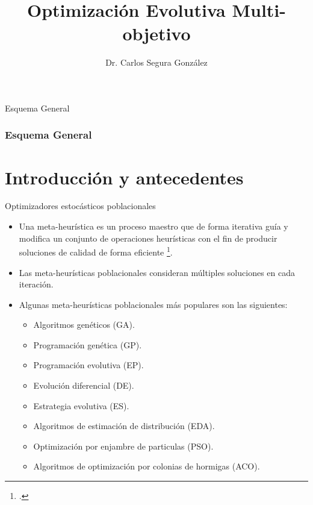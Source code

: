 \documentclass{beamer}
\title[Your Short Title]{Optimización Evolutiva Multi-objetivo}
\author{Dr. Carlos Segura González}
\institute{Centro de Investigación de Matemáticas}
\begin{document}
\begin{frame}
  \titlepage
\end{frame}

\begin{frame}{Esquema General}
\frametitle{Esquema General}
\tableofcontents
\end{frame}


\section{Introducción y antecedentes}



\begin{frame}{Optimizadores estocásticos poblacionales}
    \begin{itemize}
    \scriptsize
    \justifying
        \item Una meta-heurística es un proceso maestro que de forma iterativa guía y modifica un conjunto de operaciones heurísticas con el fin de producir soluciones de calidad de forma eficiente \footcite{voss2012meta}.
        \item Las meta-heurísticas poblacionales consideran múltiples soluciones en cada iteración.
        \item Algunas meta-heurísticas poblacionales más populares son las siguientes:
        \begin{itemize}
        \scriptsize
            \item Algoritmos genéticos (GA).
            \item Programación genética (GP).
            \item Programación evolutiva (EP).
            \item Evolución diferencial (DE).
            \item Estrategia evolutiva (ES).
            \item Algoritmos de estimación de distribución (EDA).
            \item Optimización por enjambre de particulas (PSO).
            \item Algoritmos de optimización por colonias de hormigas (ACO).
        \end{itemize}{}
    \end{itemize}{}
\end{frame}{}
\end{document}
